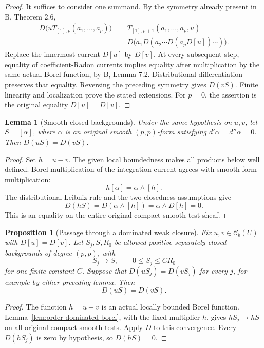 \documentclass[11pt,a4paper]{article}
\numberwithin{equation}{section}
\newtheorem{lemma}[theorem]{Lemma}
\newtheorem{proposition}[theorem]{Proposition}
\theoremstyle{definition}
\theoremstyle{remark}
\newcommand{\Cb}{\mathcal C_b}
\begin{document}
\begin{proof}
It suffices to consider one summand. By the symmetry already present
in \textup{B}, Theorem 2.6,
\begin{align*}
 D\bigl(uT_{[1],p}(a_1,\ldots,a_p)\bigr)
  &=T_{[1],p+1}(a_1,\ldots,a_p,u)\\
  &=D\bigl(a_1D(a_2\cdots D(a_pD[u])\cdots)\bigr).
\end{align*}
Replace the innermost current $D[u]$ by $D[v]$. At every subsequent
step, equality of coefficient-Radon currents implies equality after
multiplication by the same actual Borel function, by \textup{B},
Lemma 7.2. Distributional differentiation preserves that equality.
Reversing the preceding symmetry gives $D(vS)$. Finite linearity and
localization prove the stated extensions. For $p=0$, the assertion is
the original equality $D[u]=D[v]$.
\end{proof}

\begin{lemma}[Smooth closed backgrounds]
\label{lem:potential-independence-smooth}
Under the same hypothesis on $u,v$, let $S=[\alpha]$, where $\alpha$
is an original smooth $(p,p)$-form satisfying
$d'\alpha=d''\alpha=0$. Then $D(uS)=D(vS)$.
\end{lemma}

\begin{proof}
Set $h=u-v$. The given local boundedness makes all products below
well defined. Borel multiplication of the integration current agrees
with smooth-form multiplication:
\[
 h[\alpha]=\alpha\wedge[h].
\]
The distributional Leibniz rule and the two closedness assumptions give
\[
 D(hS)=D(\alpha\wedge[h])=\alpha\wedge D[h]=0.
\]
This is an equality on the entire original compact smooth test sheaf.
\end{proof}

\begin{proposition}[Passage through a dominated weak closure]
\label{prop:potential-independence-dominated-closure}
Fix $u,v\in\Cb(U)$ with $D[u]=D[v]$. Let $S_j,S,R_0$ be allowed
positive separately closed backgrounds of degree $(p,p)$, with
\[
 S_j\longrightarrow S,\qquad 0\leq S_j\leq C R_0
\]
for one finite constant $C$. Suppose that $D(uS_j)=D(vS_j)$ for every
$j$, for example by either preceding lemma. Then
\[
 D(uS)=D(vS).
\]
\end{proposition}

\begin{proof}
The function $h=u-v$ is an actual locally bounded Borel function.
Lemma~\ref{lem:order-dominated-borel}, with the fixed multiplier $h$,
gives $hS_j\to hS$ on all original compact smooth tests.
Apply $D$ to this convergence. Every $D(hS_j)$ is zero by hypothesis,
so $D(hS)=0$.
\end{proof}
\end{document}
